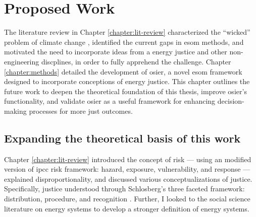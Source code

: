 \chapter{Proposed Work}
\label{chapter:proposal}

The literature review in Chapter \ref{chapter:lit-review} characterized the
``wicked'' problem of climate change \cite{grundmann_ozone_2018}, identified the
current gaps in \ac{esom} methods, and motivated the need to incorporate ideas
from a energy justice and other non-engineering discplines, in order to fully
apprehend the challenge. Chapter \ref{chapter:methods} detailed the development
of \ac{osier}, a novel \ac{esom} framework designed to incorporate conceptions
of energy justice. This chapter outlines the future work to deepen the
theoretical foundation of this thesis, improve \ac{osier}'s functionality, and
validate \ac{osier} as a useful framework for enhancing decision-making
processes for more just outcomes.

\section{Expanding the theoretical basis of this work}

Chapter \ref{chapter:lit-review} introduced the concept of risk --- using an
modified version of \ac{ipcc} risk framework: hazard, exposure, vulnerability,
and response --- explained disproportionality, and discussed various
conceptualizations of justice. Specifically, justice understood through
Schlosberg's three faceted framework: distribution, procedure, and recognition
\cite{schlosberg_environmental_2014}. Further, I looked to the social science
literature on energy systems to develop a stronger definition of energy systems.






